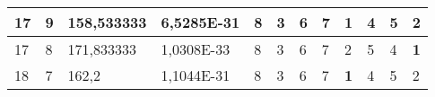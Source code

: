 \documentclass[conference]{IEEEtran}
\begin{document}
\begin{table*}[]
\begin{tabular}{|llll|llllllll|}
\multicolumn{1}{|l|}{17}                                                    & \multicolumn{1}{l|}{9}                                                        & \multicolumn{1}{l|}{158,533333}                                                   & 6,5285E-31                     & \multicolumn{1}{l|}{8}                                                  & \multicolumn{1}{l|}{3}                                                  & \multicolumn{1}{l|}{6}                                                  & \multicolumn{1}{l|}{7}                                                  & \multicolumn{1}{l|}{\textbf{1}}                                         & \multicolumn{1}{l|}{4}                                                  & \multicolumn{1}{l|}{5}                                                  & 2                          \\ \hline
\multicolumn{1}{|l|}{17}                                                    & \multicolumn{1}{l|}{8}                                                        & \multicolumn{1}{l|}{171,833333}                                                   & 1,0308E-33                     & \multicolumn{1}{l|}{8}                                                  & \multicolumn{1}{l|}{3}                                                  & \multicolumn{1}{l|}{6}                                                  & \multicolumn{1}{l|}{7}                                                  & \multicolumn{1}{l|}{2}                                                  & \multicolumn{1}{l|}{5}                                                  & \multicolumn{1}{l|}{4}                                                  & \textbf{1}                 \\ \hline
\multicolumn{1}{|l|}{18}                                                    & \multicolumn{1}{l|}{7}                                                        & \multicolumn{1}{l|}{162,2}                                                        & 1,1044E-31                     & \multicolumn{1}{l|}{8}                                                  & \multicolumn{1}{l|}{3}                                                  & \multicolumn{1}{l|}{6}                                                  & \multicolumn{1}{l|}{7}                                                  & \multicolumn{1}{l|}{\textbf{1}}                                         & \multicolumn{1}{l|}{4}                                                  & \multicolumn{1}{l|}{5}                                                  & 2                          \\ \hline

\end{tabular}
\end{table*}
\end{document}
